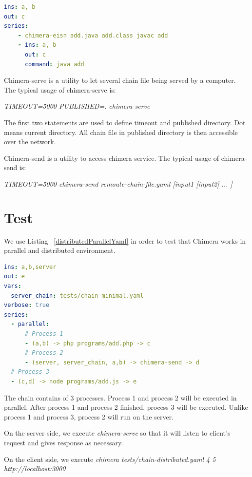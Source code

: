 \documentclass[conference]{IEEEtran}
\begin{document}
\begin{lstlisting}[caption=Chimera-eisn usage example, label=chimeraEisn, language=yaml, basicstyle=\small, breaklines=true]
ins: a, b
out: c
series:
    - chimera-eisn add.java add.class javac add
    - ins: a, b
      out: c
      command: java add
\end{lstlisting}

Chimera-serve is a utility to let several chain file being served by a computer.
The typical usage of chimera-serve is:

{\it TIMEOUT=5000 PUBLISHED=. chimera-serve}

The first two statements are used to define timeout and published directory. Dot means
current directory. All chain file in published directory is then accessible over
the network.

Chimera-send is a utility to access chimera service.
The typical usage of chimera-send is: 

{\it TIMEOUT=5000 chimera-send remoute-chain-file.yaml [input1 [input2] ... ]}


\section{Test}

We use Listing ~\ref{distributedParallelYaml} in order to test that Chimera works
in parallel and distributed environment.

\begin{lstlisting}[caption=Distributed and Parallel YAML-chain Scenario, label=distributedParallelYaml, language=yaml, basicstyle=\small, breaklines=true]
ins: a,b,server
out: e
vars:
  server_chain: tests/chain-minimal.yaml 
verbose: true
series:
  - parallel:
      # Process 1
      - (a,b) -> php programs/add.php -> c
      # Process 2
      - (server, server_chain, a,b) -> chimera-send -> d
  # Process 3
  - (c,d) -> node programs/add.js -> e
\end{lstlisting}

The chain contains of 3 processes. Process 1 and process 2 will be executed in parallel.
After process 1 and process 2 finished, process 3 will be executed. Unlike process 1 and
process 3, process 2 will run on the server.

On the server side, we execute {\it chimera-serve} so that it will listen to client's request
and gives response as necessary.

On the client side, we execute {\it chimera tests/chain-distributed.yaml 4 5 http://localhost:3000}
\end{document}
